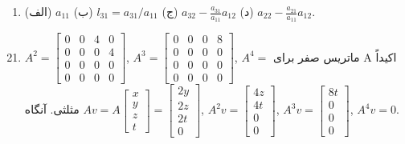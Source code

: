 \documentclass[12pt,a4paper]{article}
\begin{document}
{\begin{enumerate}
			\item (الف) $a_{11}$ (ب) $l_{31} = a_{31}/a_{11}$ (ج) $a_{32} - \frac{a_{31}}{a_{11}}a_{12}$ (د) $a_{22} - \frac{a_{21}}{a_{11}}a_{12}$.
		\end{enumerate}
		

		\begin{enumerate}
			\setcounter{enumi}{20}
			\item $A^2 = \begin{bmatrix} 0 & 0 & 4 & 0 \\ 0 & 0 & 0 & 4 \\ 0 & 0 & 0 & 0 \\ 0 & 0 & 0 & 0 \end{bmatrix}$, $A^3 = \begin{bmatrix} 0 & 0 & 0 & 8 \\ 0 & 0 & 0 & 0 \\ 0 & 0 & 0 & 0 \\ 0 & 0 & 0 & 0 \end{bmatrix}$, $A^4=$ ماتریس صفر برای A اکیداً مثلثی.
			آنگاه $Av = A \begin{bmatrix} x \\ y \\ z \\ t \end{bmatrix} = \begin{bmatrix} 2y \\ 2z \\ 2t \\ 0 \end{bmatrix}$, $A^2v = \begin{bmatrix} 4z \\ 4t \\ 0 \\ 0 \end{bmatrix}$, $A^3v = \begin{bmatrix} 8t \\ 0 \\ 0 \\ 0 \end{bmatrix}$, $A^4v=0$.
			

\end{enumerate}}
\end{document}
